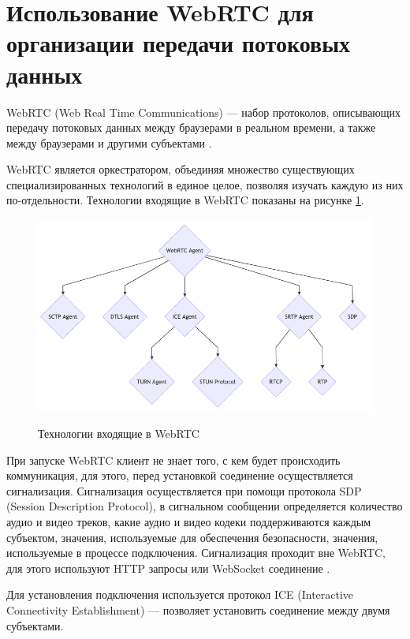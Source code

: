\section{Использование WebRTC для организации передачи потоковых данных}

WebRTC (Web Real Time Communications) — набор протоколов, описывающих передачу потоковых данных между браузерами в реальном времени, а также между браузерами и другими субъектами \cite{WebRTCStandardization}.

WebRTC является оркестратором, объединяя множество существующих специализированных технологий в единое целое, позволяя изучать каждую из них по-отдельности. Технологии входящие в WebRTC показаны на рисунке \ref{fig:webrtc}. 

\begin{figure}[H]
\begin{center}
\includegraphics[width=1.0\hsize]{fig/webrtc.png}\\[2mm]
\caption{Технологии входящие в WebRTC}\label{fig:webrtc}
\end{center}
\end{figure}

При запуске WebRTC клиент не знает того, с кем будет происходить коммуникация, для этого, перед установкой соединение осуществляется сигнализация. Сигнализация осуществляется при помощи протокола SDP (Session Description Protocol), в сигнальном сообщении определяется количество аудио и видео треков, какие аудио и видео кодеки поддерживаются каждым субъектом, значения, используемые для обеспечения безопасности, значения, используемые в процессе подключения. Сигнализация проходит вне WebRTC, для этого используют HTTP запросы или WebSocket соединение \cite{rfc8835}.

Для установления подключения используется протокол ICE (Interactive Connectivity Establishment) — позволяет установить соединение между двумя субъектами.

